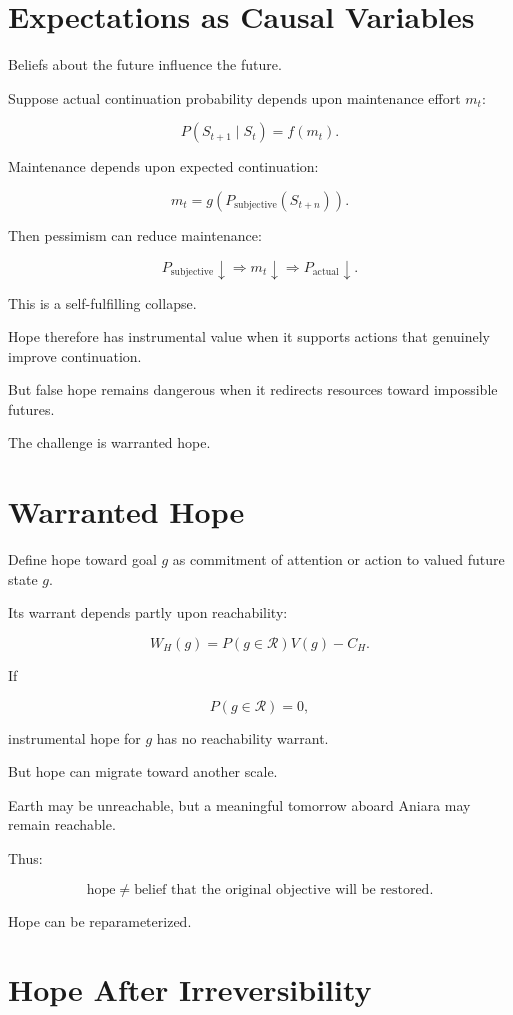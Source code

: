 \documentclass[11pt,oneside]{book}
\theoremstyle{definition}
\theoremstyle{remark}
\newcommand{\R}{\mathcal{R}}
\begin{document}
\section{Expectations as Causal Variables}

Beliefs about the future influence the future.

Suppose actual continuation probability depends upon maintenance effort \(m_t\):

\[
P(S_{t+1}\mid S_t)
=
f(m_t).
\]

Maintenance depends upon expected continuation:

\[
m_t
=
g(P_{\mathrm{subjective}}(S_{t+n})).
\]

Then pessimism can reduce maintenance:

\[
P_{\mathrm{subjective}}\downarrow
\Rightarrow
m_t\downarrow
\Rightarrow
P_{\mathrm{actual}}\downarrow.
\]

This is a self-fulfilling collapse.

Hope therefore has instrumental value when it supports actions that genuinely improve continuation.

But false hope remains dangerous when it redirects resources toward impossible futures.

The challenge is warranted hope.

\section{Warranted Hope}

Define hope toward goal \(g\) as commitment of attention or action to valued future state \(g\).

Its warrant depends partly upon reachability:

\[
W_H(g)
=
P(g\in\R)V(g)-C_H.
\]

If

\[
P(g\in\R)=0,
\]

instrumental hope for \(g\) has no reachability warrant.

But hope can migrate toward another scale.

Earth may be unreachable, but a meaningful tomorrow aboard Aniara may remain reachable.

Thus:

\[
\text{hope}
\neq
\text{belief that the original objective will be restored}.
\]

Hope can be reparameterized.

\section{Hope After Irreversibility}
\end{document}

